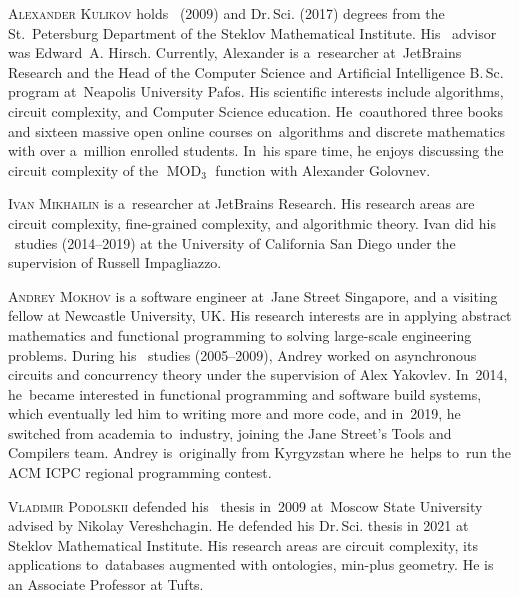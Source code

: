 \documentclass{toc}
\begin{document}
\begin{tocaboutauthors}
\begin{tocabout}[kulikov]
  \textsc{Alexander Kulikov}  %
  holds \phd\ (2009) and Dr.\,Sci. (2017) degrees from the
St.~Petersburg Department of the Steklov Mathematical Institute. 
His \phd\ advisor was Edward~A. Hirsch.
Currently, Alexander is a~researcher at~JetBrains Research
and the Head of the Computer Science and Artificial Intelligence B.\,Sc. program
at~Neapolis University Pafos.
His scientific interests include algorithms, circuit complexity, and Computer Science
education.  He~coauthored 
three books and sixteen massive open online courses on~algorithms and discrete mathematics with over a~million enrolled students.
In~his spare time, he enjoys discussing the 
circuit complexity of the $\operatorname{MOD}_3$ function with Alexander Golovnev.
\end{tocabout}
\begin{tocabout}[mikhailin]
  \textsc{Ivan Mikhailin}    %
  is a~researcher at JetBrains Research.
  His research areas are circuit complexity,
  fine-grained complexity, and algorithmic theory.
  Ivan did his \phd\ studies (2014--2019)
  at the University of California San Diego
  under the supervision of Russell Impagliazzo.
\end{tocabout}
\begin{tocabout}[mokhov]
  \textsc{Andrey Mokhov} is a software engineer at~Jane Street Singapore, and
  a visiting fellow at Newcastle University, UK. His research interests are in
  applying abstract mathematics and functional programming to solving large-scale engineering problems. During his \phd\
  studies (2005--2009), Andrey worked on asynchronous circuits and concurrency theory under the supervision of Alex Yakovlev.
  In~2014, he~became interested in functional programming and software build systems, which
  eventually led him to writing more and more code, and in~2019, he switched from
  academia to~industry, joining the Jane Street's Tools and Compilers team.
  Andrey is~originally from Kyrgyzstan where he~helps to~run the ACM ICPC
regional programming contest.
\end{tocabout}
\begin{tocabout}[podolskii]
  \textsc{Vladimir Podolskii}   %
  defended his \phd\ thesis in~2009 at~Moscow State University
advised by Nikolay Vereshchagin. He defended his Dr.\,Sci. thesis in 2021 at Steklov
Mathematical Institute.
His research areas are circuit complexity, its applications to~databases augmented with
ontologies, min-plus geometry. He is an Associate Professor at Tufts.
\end{tocabout}
\end{tocaboutauthors}
\end{document}
